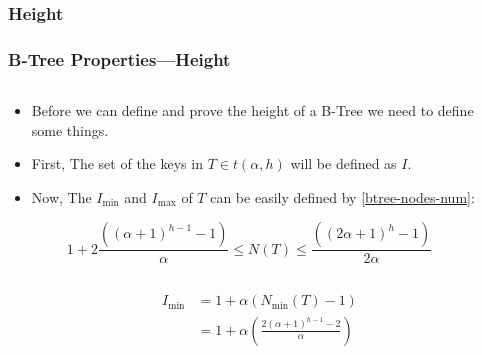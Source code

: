 \begin{frame}
    \subsubsection{Height}
    \frametitle{B-Tree Properties---Height}
    \begin{columns}
        \begin{column}{\textlecolumn}
            \begin{block}{}
                \begin{itemize}
                    \item Before we can define and prove the height of a B-Tree we need to define some things.
                    \item First, The set of the keys in \(T \in t\left(\alpha, h\right)\) will be defined as \(I\). 
                    \item Now, The \(I_{\text{min}}\) and \(I_{\text{max}}\) of \(T\) can be easily defined by \eqref{btree-nodes-num}:
                \end{itemize}
            \end{block}
            \vspace{-0.35cm}
            \begin{tcolorbox}[boxsep=0mm,left=0mm,right=0mm,top=-2mm,halign=right]
                \[
                    1 + 2\frac{\left(\left(\alpha + 1\right)^{h - 1} - 1\right)}{\alpha} 
                    \leq 
                    N\left(T\right) 
                    \leq 
                    \frac{\left(\left(2\alpha + 1\right)^{h} - 1\right)}{2\alpha}
                \]
            \end{tcolorbox}
        \end{column}
        \begin{column}{\textricolumn}
        \end{column}
    \end{columns}
    \begin{columns}
        \begin{column}{0.5\textwidth}
            \vspace{-0.75cm}
            \begin{block}{}
                \[
                    \begin{aligned}
                        I_{\text{min}} &= 1 + \alpha\left(N_{\text{min}}\left(T\right) - 1\right) \\
                        &= 1 + \alpha\left(\frac{2\left(\alpha + 1\right)^{h - 1} - 2}{\alpha}\right) \\

\end{aligned}\]
\end{block}
\end{column}
\end{columns}
\end{frame}
